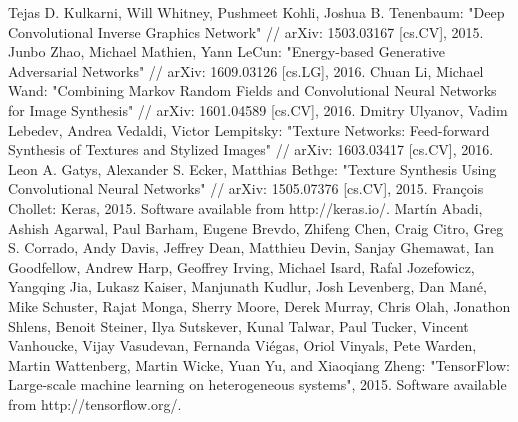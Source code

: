 \documentclass[a4paper]{article}
\begin{document}
\begin{thebibliography}{99}
		 Tejas D. Kulkarni, Will Whitney, Pushmeet Kohli, Joshua B. Tenenbaum: "Deep Convolutional Inverse Graphics Network" // arXiv: 1503.03167 [cs.CV], 2015.
		 Junbo Zhao, Michael Mathien, Yann LeCun: "Energy-based Generative Adversarial Networks" // arXiv: 1609.03126 [cs.LG], 2016.
		 Chuan Li, Michael Wand: "Combining Markov Random Fields and Convolutional Neural Networks for Image Synthesis" // arXiv: 1601.04589 [cs.CV], 2016.
		 Dmitry Ulyanov, Vadim Lebedev, Andrea Vedaldi, Victor Lempitsky: "Texture Networks: Feed-forward Synthesis of Textures and Stylized Images" // arXiv: 1603.03417 [cs.CV], 2016.
		 Leon A. Gatys, Alexander S. Ecker, Matthias Bethge: "Texture Synthesis Using Convolutional Neural Networks" // arXiv: 1505.07376 [cs.CV], 2015.
		 François Chollet: Keras, 2015. Software available from http://keras.io/.
		 Martín Abadi, Ashish Agarwal, Paul Barham, Eugene Brevdo, Zhifeng Chen, Craig Citro, Greg S. Corrado, Andy Davis, Jeffrey Dean, Matthieu Devin, Sanjay Ghemawat, Ian Goodfellow, Andrew Harp, Geoffrey Irving, Michael Isard, Rafal Jozefowicz, Yangqing Jia, Lukasz Kaiser, Manjunath Kudlur, Josh Levenberg, Dan Mané, Mike Schuster, Rajat Monga, Sherry Moore, Derek Murray, Chris Olah, Jonathon Shlens, Benoit Steiner, Ilya Sutskever, Kunal Talwar, Paul Tucker, Vincent Vanhoucke, Vijay Vasudevan, Fernanda Viégas, Oriol Vinyals, Pete Warden, Martin Wattenberg, Martin Wicke, Yuan Yu, and Xiaoqiang Zheng: "TensorFlow: Large-scale machine learning on heterogeneous systems", 2015. Software available from http://tensorflow.org/.
	\end{thebibliography}
	
\end{document}
